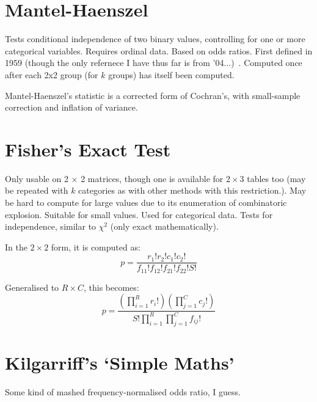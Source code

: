 \documentclass[11pt]{article}
\begin{document}
\section{Mantel-Haenszel}
\label{section:mantelhaenszel}
Tests conditional independence of two binary values, controlling for one or more categorical variables.  Requires ordinal data.  Based on odds ratios.  First defined in 1959 {\color{red} (though the only refernece I have thus far is from '04...)}~\cite{mantel2004statistical}.  Computed once after each 2x2 group (for $k$ groups) has itself been computed.


Mantel-Haenszel's statistic is a corrected form of Cochran's, with small-sample correction and inflation of variance.


\section{Fisher's Exact Test}
Only usable on 2 $\times$ 2 matrices, though one is available for $2\times 3$ tables too (may be repeated with $k$ categories as with other methods with this restriction.).
May be hard to compute for large values due to its enumeration of combinatoric explosion.  Suitable for small values.  Used for categorical data.  Tests for independence, similar to $\chi^2$ (only exact mathematically). 

In the $2\times 2$ form, it is computed as:
$$
p = \frac{ r_1!r_2!c_1!c_2! }{ f_{11}!f_{12}!f_{21}!f_{22}!S! }
$$

Generalised to $R\times C$, this becomes:
$$
p = \frac{ (\prod_{i=1}^{R}{ r_i! })  (\prod_{j=1}^{C}{ c_j! }) }{ S! \prod_{i=1}^{R}{  \prod_{j=1}^{C}{ f_{ij}! }}    }
$$


\section{Kilgarriff's `Simple Maths'}
Some kind of mashed frequency-normalised odds ratio, I guess.
\end{document}

